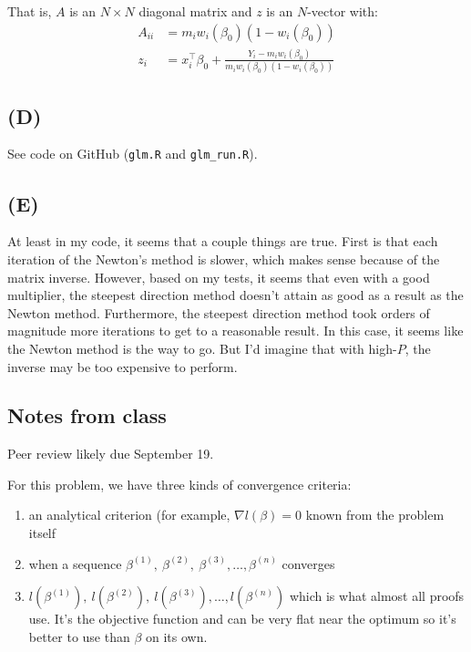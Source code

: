 \documentclass{article}
\begin{document}
That is, $A$ is an $N\times N$ diagonal matrix and $z$ is an $N$-vector with:
\begin{align*}
A_{ii}&=m_i w_i(\beta_0) (1-w_i(\beta_0))\\
z_i&=x_i^\top\beta_0+\frac{Y_i-m_i w_i(\beta_0)}{m_i w_i(\beta_0) (1-w_i(\beta_0))}
\end{align*}


\subsection{(D)}
See code on GitHub (\texttt{glm.R} and \texttt{glm\_run.R}).

\subsection{(E)}
At least in my code, it seems that a couple things are true. First is that each iteration of the Newton's method is slower,
which makes sense because of the matrix inverse. However, based on my tests, it seems that even with a good multiplier, the steepest direction method doesn't attain as good as a result as the Newton method. Furthermore, the
steepest direction method took orders of magnitude more iterations to get to a reasonable result. In this case, it seems
like the Newton method is the way to go. But I'd imagine that with high-$P$, the inverse may be too expensive to perform.

\subsection{Notes from class}
Peer review likely due September 19.

For this problem, we have three kinds of convergence criteria:
\begin{enumerate}[1.]
\item an analytical criterion (for example, $\nabla l(\beta)=0$ known from the problem itself
\item when a sequence $\beta^{(1)},~\beta^{(2)},~\beta^{(3)},\ldots,\beta^{(n)}$ converges
\item $l(\beta^{(1)}),~l(\beta^{(2)}),~l(\beta^{(3)}),\ldots,l(\beta^{(n)})$ which is what almost all proofs use. It's the objective function and can be very flat near the optimum so it's better to use than $\beta$ on its own.
\end{enumerate}
\end{document}
